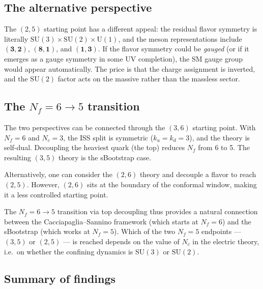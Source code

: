 \documentclass[11pt,a4paper]{article}
\newcommand{\Nf}{N_{\!f}}
\newcommand{\Nc}{N_{\!c}}
\newcommand{\rep}[1]{\mathbf{#1}}
\begin{document}
\subsection{The alternative perspective}

The $(2,5)$ starting point has a different appeal: the residual
flavor symmetry is literally
$\mathrm{SU}(3) \times \mathrm{SU}(2) \times \mathrm{U}(1)$, and
the meson representations include $(\rep{3},\rep{2})$,
$(\rep{8},\rep{1})$, and $(\rep{1},\rep{3})$.
If the flavor symmetry could be \emph{gauged} (or if it emerges as a
gauge symmetry in some UV completion), the SM gauge group would
appear automatically.
The price is that the charge assignment is inverted, and the
$\mathrm{SU}(2)$ factor acts on the massive rather than the massless
sector.

\subsection{The $\Nf = 6 \to 5$ transition}

The two perspectives can be connected through the $(3,6)$ starting
point.  With $\Nf = 6$ and $\Nc = 3$, the ISS split is symmetric
($k_u = k_d = 3$), and the theory is self-dual.
Decoupling the heaviest quark (the top) reduces $\Nf$ from 6 to 5.
The resulting $(3,5)$ theory is the sBootstrap case.

Alternatively, one can consider the $(2,6)$ theory and decouple a
flavor to reach $(2,5)$.  However, $(2,6)$ sits at the boundary of
the conformal window, making it a less controlled starting point.

The $\Nf = 6 \to 5$ transition via top decoupling thus provides a
natural connection between the Cacciapaglia--Sannino framework (which
starts at $\Nf = 6$) and the sBootstrap (which works at $\Nf = 5$).
Which of the two $\Nf = 5$ endpoints --- $(3,5)$ or $(2,5)$ ---
is reached depends on the value of $\Nc$ in the electric theory,
i.e.\ on whether the confining dynamics is $\mathrm{SU}(3)$ or
$\mathrm{SU}(2)$.

\subsection{Summary of findings}
\end{document}
